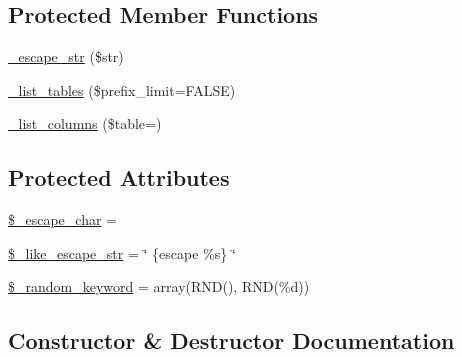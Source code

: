 \subsection*{Protected Member Functions}
\begin{DoxyCompactItemize}
\item 
\mbox{\hyperlink{class_c_i___d_b__pdo__odbc__driver_af8ef0237bfcdb19215b63fff769e7a55}{\+\_\+escape\+\_\+str}} (\$str)
\item 
\mbox{\hyperlink{class_c_i___d_b__pdo__odbc__driver_a435c0f3ce54fe7daa178baa8532ebd54}{\+\_\+list\+\_\+tables}} (\$prefix\+\_\+limit=F\+A\+L\+SE)
\item 
\mbox{\hyperlink{class_c_i___d_b__pdo__odbc__driver_a7ccb7f9c301fe7f0a9db701254142b63}{\+\_\+list\+\_\+columns}} (\$table=\textquotesingle{}\textquotesingle{})
\end{DoxyCompactItemize}
\subsection*{Protected Attributes}
\begin{DoxyCompactItemize}
\item 
\mbox{\hyperlink{class_c_i___d_b__pdo__odbc__driver_aaec2fb0112850159063a8e47ad3aed6e}{\$\+\_\+escape\+\_\+char}} = \textquotesingle{}\textquotesingle{}
\item 
\mbox{\hyperlink{class_c_i___d_b__pdo__odbc__driver_adf86ecadf3d0e1ce3f5e0eaeeb3867ae}{\$\+\_\+like\+\_\+escape\+\_\+str}} = \char`\"{} \{escape \textquotesingle{}\%s\textquotesingle{}\} \char`\"{}
\item 
\mbox{\hyperlink{class_c_i___d_b__pdo__odbc__driver_a10213aa6e05f6d924d3277bb1d2fea00}{\$\+\_\+random\+\_\+keyword}} = array(\textquotesingle{}R\+ND()\textquotesingle{}, \textquotesingle{}R\+ND(\%d)\textquotesingle{})
\end{DoxyCompactItemize}


\subsection{Constructor \& Destructor Documentation}
\mbox{\label{class_c_i___d_b__pdo__odbc__driver_a9162320adff1a1a4afd7f2372f753a3e}} 
